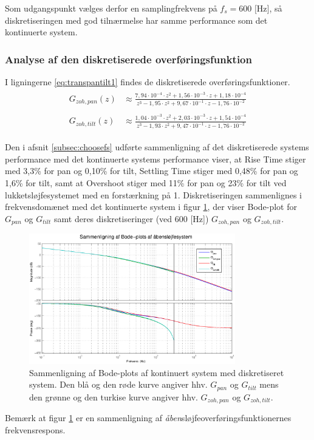 Som udgangspunkt vælges derfor en samplingfrekvens på \(f_s=600 \text{ [Hz]}\),
så diskretiseringen med god tilnærmelse har samme performance som det kontinuerte system.

\subsubsection{Analyse af den diskretiserede overføringsfunktion}
I ligningerne \ref{eq:transpantilt1} findes de diskretiserede overføringsfunktioner.
\begin{align}
\label{eq:transpantilt1}
\begin{split}
	G_{zoh,pan}\left(z\right)&\approx\frac{7,94\cdot{}10^{-4}\cdot{}z^2
							+1,56\cdot{}10^{-3}\cdot{}z
							+1,18\cdot{}10^{-4}}
							{z^3 - 1,95\cdot{}z^2+9,67\cdot{}10^{-1}\cdot{z}-1,76\cdot{}10^{-2}}
	\\
	\\
	G_{zoh,tilt}\left(z\right)&\approx\frac{1,04\cdot{}10^{-3}\cdot{}z^2
							+2,03\cdot{}10^{-3}\cdot{}z
							+1,54\cdot{}10^{-4}}
							{z^3 - 1,93\cdot{}z^2+9,47\cdot{}10^{-1}\cdot{z}-1,76\cdot{}10^{-2}}
\end{split}
\end{align}
 
Den i afsnit \ref{subsec:choosefs} udførte sammenligning af det diskretiserede systems performance
med det kontinuerte systems performance viser,
at Rise Time stiger med 3,3\% for pan og 0,10\% for tilt,
Settling Time stiger med 0,48\% for pan og 1,6\% for tilt,
samt at Overshoot stiger med 11\% for pan og 23\% for tilt
ved lukketsløjfesystemet med en forstærkning på 1.
Diskretiseringen sammenlignes i frekvensdomænet med det kontinuerte system
i figur \ref{fig:diskretBode}, der viser Bode-plot for \(G_{pan}\) og \(G_{tilt}\) samt
deres diskretiseringer (ved 600 [Hz]) \(G_{zoh,pan}\) og \(G_{zoh,tilt}\).
\begin{figure}[!th]
\centering
	\includegraphics[width=0.8\textwidth]{./graphics/diskretBode.eps}
	\captionsetup{width=0.7\textwidth}
\caption[Sammenligning af Bode-plots]
{Sammenligning af Bode-plots af kontinuert system med diskretiseret system.
Den blå og den røde kurve angiver hhv. \(G_{pan}\) og \(G_{tilt}\) mens
den grønne og den turkise kurve angiver hhv. \(G_{zoh,pan}\) og \(G_{zoh,tilt}\).
}
\label{fig:diskretBode}
\end{figure}
Bemærk at figur \ref{fig:diskretBode} er en sammenligning af \textit{åben}sløjfeoverføringsfunktionernes
frekvensrespons.

